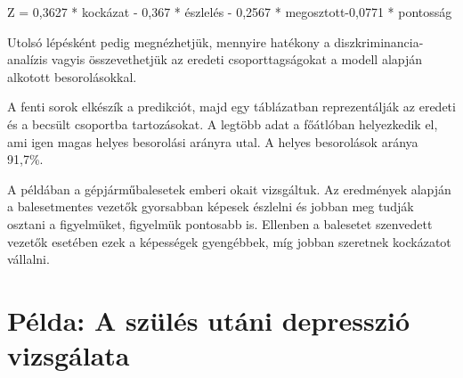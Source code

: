 \documentclass[
  letterpaper,
]{krantz}
\makeatletter
\newenvironment{Shaded}{\begin{snugshade}}{\end{snugshade}}
\newcommand{\AttributeTok}[1]{\textcolor[rgb]{0.40,0.45,0.13}{#1}}
\newcommand{\CommentTok}[1]{\textcolor[rgb]{0.37,0.37,0.37}{#1}}
\newcommand{\DecValTok}[1]{\textcolor[rgb]{0.68,0.00,0.00}{#1}}
\newcommand{\FunctionTok}[1]{\textcolor[rgb]{0.28,0.35,0.67}{#1}}
\newcommand{\NormalTok}[1]{\textcolor[rgb]{0.00,0.23,0.31}{#1}}
\newcommand{\OtherTok}[1]{\textcolor[rgb]{0.00,0.23,0.31}{#1}}
\newcommand{\SpecialCharTok}[1]{\textcolor[rgb]{0.37,0.37,0.37}{#1}}
\newcommand{\StringTok}[1]{\textcolor[rgb]{0.13,0.47,0.30}{#1}}
\newenvironment{kframe}{%
\medskip{}
\setlength{\fboxsep}{.8em}
 \def\at@end@of@kframe{}%
 \ifinner\ifhmode%
  \def\at@end@of@kframe{\end{minipage}}%
  \begin{minipage}{\columnwidth}%
 \fi\fi%
 \def\FrameCommand##1{\hskip\@totalleftmargin \hskip-\fboxsep
 \colorbox{shadecolor}{##1}\hskip-\fboxsep
     \hskip-\linewidth \hskip-\@totalleftmargin \hskip\columnwidth}%
 \MakeFramed {\advance\hsize-\width
   \@totalleftmargin\z@ \linewidth\hsize
   \@setminipage}}%
 {\par\unskip\endMakeFramed%
 \at@end@of@kframe}
\renewenvironment{Shaded}{\begin{kframe}}{\end{kframe}}
\makeatother
\begin{document}
\begin{Shaded}
\begin{Highlighting}[]
\NormalTok{Z = 0,3627 * kockázat {-} 0,367 * észlelés {-} 0,2567 * megosztott{-}0,0771 * pontosság}
\end{Highlighting}
\end{Shaded}

Utolsó lépésként pedig megnézhetjük, mennyire hatékony a
diszkriminancia-analízis vagyis összevethetjük az eredeti
csoporttagságokat a modell alapján alkotott besorolásokkal.

\begin{Shaded}
\end{Shaded}

A fenti sorok elkészík a predikciót, majd egy táblázatban reprezentálják
az eredeti és a becsült csoportba tartozásokat. A legtöbb adat a
főátlóban helyezkedik el, ami igen magas helyes besorolási arányra utal.
A helyes besorolások aránya 91,7\%.

A példában a gépjárműbalesetek emberi okait vizsgáltuk. Az eredmények
alapján a balesetmentes vezetők gyorsabban képesek észlelni és jobban
meg tudják osztani a figyelmüket, figyelmük pontosabb is. Ellenben a
balesetet szenvedett vezetők esetében ezek a képességek gyengébbek, míg
jobban szeretnek kockázatot vállalni.

\hypertarget{puxe9lda-a-szuxfcluxe9s-utuxe1ni-depressziuxf3-vizsguxe1lata}{%
\section{Példa: A szülés utáni depresszió
vizsgálata}\label{puxe9lda-a-szuxfcluxe9s-utuxe1ni-depressziuxf3-vizsguxe1lata}}
\end{document}
